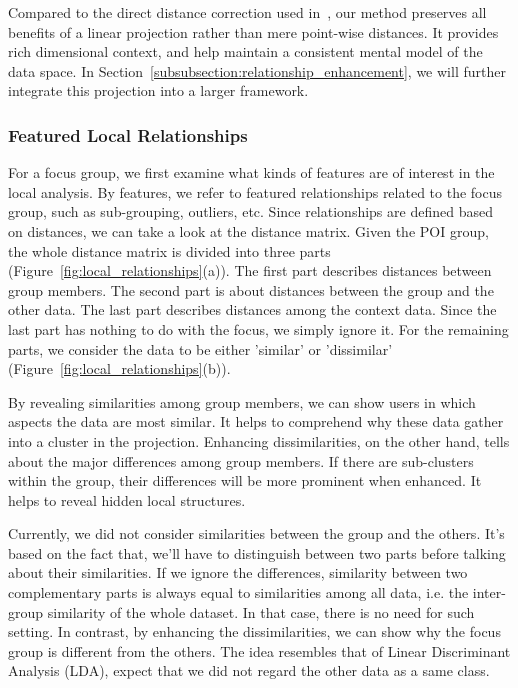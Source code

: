 Compared to the direct distance correction used in~\cite{DBLP:journals/tvcg/StahnkeDMT16}, our method preserves all benefits of a linear projection rather than mere point-wise distances. It provides rich dimensional context, and help maintain a consistent mental model of the data space. In Section~\ref{subsubsection:relationship_enhancement}, we will further integrate this projection into a larger framework.

\subsubsection{Featured Local Relationships}
For a focus group, we first examine what kinds of features are of interest in the local analysis. By features, we refer to featured relationships related to the focus group, such as sub-grouping, outliers, etc. Since relationships are defined based on distances, we can take a look at the distance matrix. Given the POI group, the whole distance matrix is divided into three parts (Figure~\ref{fig:local_relationships}(a)). The first part describes distances between group members. The second part is about distances between the group and the other data. The last part describes distances among the context data. Since the last part has nothing to do with the focus, we simply ignore it. For the remaining parts, we consider the data to be either 'similar' or 'dissimilar' (Figure~\ref{fig:local_relationships}(b)).

By revealing similarities among group members, we can show users in which aspects the data are most similar. It helps to comprehend why these data gather into a cluster in the projection. Enhancing dissimilarities, on the other hand, tells about the major differences among group members. If there are sub-clusters within the group, their differences will be more prominent when enhanced. It helps to reveal hidden local structures.

Currently, we did not consider similarities between the group and the others. It's based on the fact that, we'll have to distinguish between two parts before talking about their similarities. If we ignore the differences, similarity between two complementary parts is always equal to similarities among all data, i.e. the inter-group similarity of the whole dataset. In that case, there is no need for such setting. In contrast, by enhancing the dissimilarities, we can show why the focus group is different from the others. The idea resembles that of Linear Discriminant Analysis (LDA), expect that we did not regard the other data as a same class.

